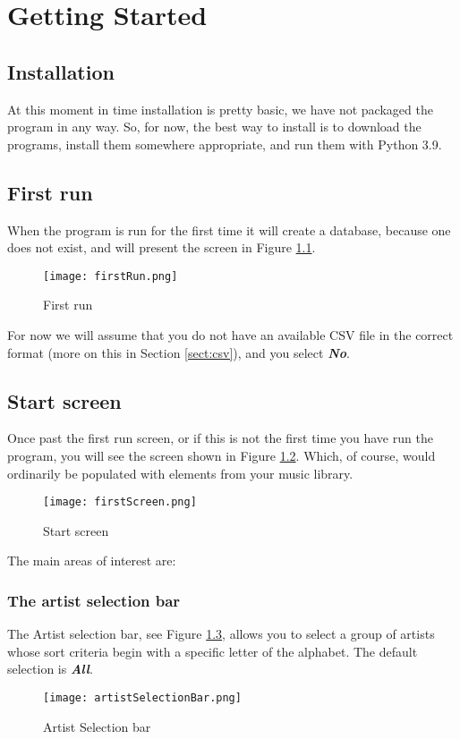 \chapter{Getting Started}
\section{Installation}
At this moment in time installation is pretty basic, we have not packaged the program in any way.  So, for now, the best way to install is to download the programs, install them somewhere appropriate, and run them with Python 3.9.
 
\section{First run}
When the program is run for the first time it will create a database, because one does not exist, and will present the screen in Figure 
\ref{fig:First run}.
\begin{figure}[!ht]
  \texttt{[image: firstRun.png]}
  \caption{First run}
  \label{fig:First run}
\end{figure}
For now we will assume that you do not have an available CSV file in the correct format (more on this in Section 
\ref{sect:csv}),
and you select 
\textbf{\textit{No}}.


\section{Start screen}
Once past the first run screen, or if this is not the first time you have run the program, you will see the screen shown in Figure 
\ref{fig:Start screen}.
Which, of course, would ordinarily be populated with elements from your music library.
\begin{figure}[!ht]
  \texttt{[image: firstScreen.png]}
  \caption{Start screen}
  \label{fig:Start screen}
\end{figure}
The main areas of interest are:

\subsection{The artist selection bar}
The Artist selection bar, see Figure 
\ref{fig:Artist Selection bar},
allows you to select a group of artists whose sort criteria begin with a specific letter of the alphabet.  The default selection is 
\textbf{\textit{All}}.
\begin{figure}[!ht]
  \texttt{[image: artistSelectionBar.png]}
  \caption{Artist Selection bar}
  \label{fig:Artist Selection bar}
\end{figure}
\newpage
